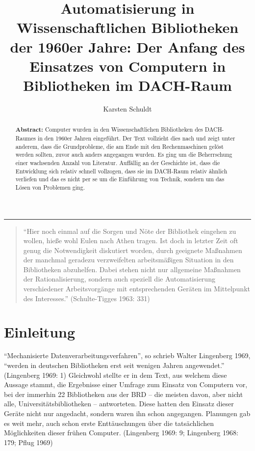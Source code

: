\documentclass[a4paper,
fontsize=11pt,
oneside,
numbers=noperiodatend,
parskip=half-,
bibliography=totoc,
final
]{scrartcl}
\title{\LARGE{Automatisierung in Wissenschaftlichen Bibliotheken der 1960er Jahre: Der Anfang des Einsatzes von Computern in Bibliotheken im DACH-Raum}}%
\author{Karsten Schuldt} %
\date{}
\begin{document}
\maketitle
\thispagestyle{fancyplain} 

\begin{abstract}
\noindent
\textbf{Abstract:} Computer wurden in den Wissenschaftlichen Bibliotheken des DACH-Raumes
in den 1960er Jahren eingeführt. Der Text vollzieht dies nach und zeigt
unter anderem, dass die Grundprobleme, die am Ende mit den
Rechenmaschinen gelöst werden sollten, zuvor auch anders angegangen
wurden. Es ging um die Beherrschung einer wachsenden Anzahl von
Literatur. Auffällig an der Geschichte ist, dass die Entwicklung sich
relativ schnell vollzogen, dass sie im DACH-Raum relativ ähnlich
verliefen und das es nicht per se um die Einführung von Technik, sondern
um das Lösen von Problemen ging.
\end{abstract}

\begin{center}\rule{0.5\linewidth}{0.5pt}\end{center}


\begin{quote}
\enquote{Hier noch einmal auf die Sorgen und Nöte der Bibliothek eingehen zu
wollen, hieße wohl Eulen nach Athen tragen. Ist doch in letzter Zeit oft
genug die Notwendigkeit diskutiert worden, durch geeignete Maßnahmen der
manchmal geradezu verzweifelten arbeitsmäßigen Situation in den
Bibliotheken abzuhelfen. Dabei stehen nicht nur allgemeine Maßnahmen der
Rationalisierung, sondern auch speziell die Automatisierung
verschiedener Arbeitsvorgänge mit entsprechenden Geräten im Mittelpunkt
des Interesses.} (Schulte-Tigges 1963: 331)
\end{quote}

\hypertarget{einleitung}{%
\section{Einleitung}\label{einleitung}}

\enquote{Mechanisierte Datenverarbeitungsverfahren}, so schrieb Walter
Lingenberg 1969, \enquote{werden in deutschen Bibliotheken erst seit wenigen
Jahren angewendet.} (Lingenberg 1969: 1) Gleichwohl stellte er in dem
Text, aus welchem diese Aussage stammt, die Ergebnisse einer Umfrage zum
Einsatz von Computern vor, bei der immerhin 22 Bibliotheken aus der BRD
-- die meisten davon, aber nicht alle, Universitätsbibliotheken --
antworteten. Diese hatten den Einsatz dieser Geräte nicht nur angedacht,
sondern waren ihn schon angegangen. Planungen gab es weit mehr, auch
schon erste Enttäuschungen über die tatsächlichen Möglichkeiten dieser
frühen Computer. (Lingenberg 1969: 9; Lingenberg 1968: 179; Pflug 1969)
\end{document}
